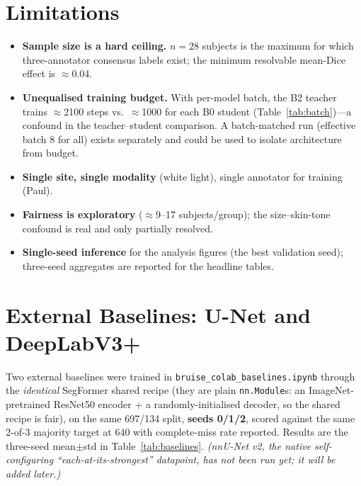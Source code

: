 \documentclass[11pt]{article}
\begin{document}
\section{Limitations}
\label{sec:limits}
\begin{itemize}[leftmargin=1.4em]
\item \textbf{Sample size is a hard ceiling.} $n=28$ subjects is the maximum for
      which three-annotator consensus labels exist; the minimum resolvable mean-Dice
      effect is $\approx$0.04.
\item \textbf{Unequalised training budget.} With per-model batch, the B2 teacher
      trains $\approx$2100 steps vs.\ $\approx$1000 for each B0 student
      (Table~\ref{tab:batch})---a confound in the teacher--student comparison.
      A batch-matched run (effective batch 8 for all) exists separately and could
      be used to isolate architecture from budget.
\item \textbf{Single site, single modality} (white light), single annotator for
      training (Paul).
\item \textbf{Fairness is exploratory} ($\approx$9--17 subjects/group); the
      size--skin-tone confound is real and only partially resolved.
\item \textbf{Single-seed inference} for the analysis figures (the best
      validation seed); three-seed aggregates are reported for the headline tables.
\end{itemize}

\section{External Baselines: U-Net and DeepLabV3+}
\label{sec:baselines}
Two external baselines were trained in \texttt{bruise\_colab\_baselines.ipynb} through the
\emph{identical} SegFormer shared recipe (they are plain \texttt{nn.Module}s: an
ImageNet-pretrained ResNet50 encoder + a randomly-initialised decoder, so the shared recipe
is fair), on the same 697/134 split, \textbf{seeds 0/1/2}, scored against the same 2-of-3
majority target at 640 with complete-miss rate reported. Results are the three-seed
mean$\pm$std in Table~\ref{tab:baselines}. \emph{(nnU-Net v2, the native self-configuring
``each-at-its-strongest'' datapoint, has not been run yet; it will be added later.)}
\end{document}
